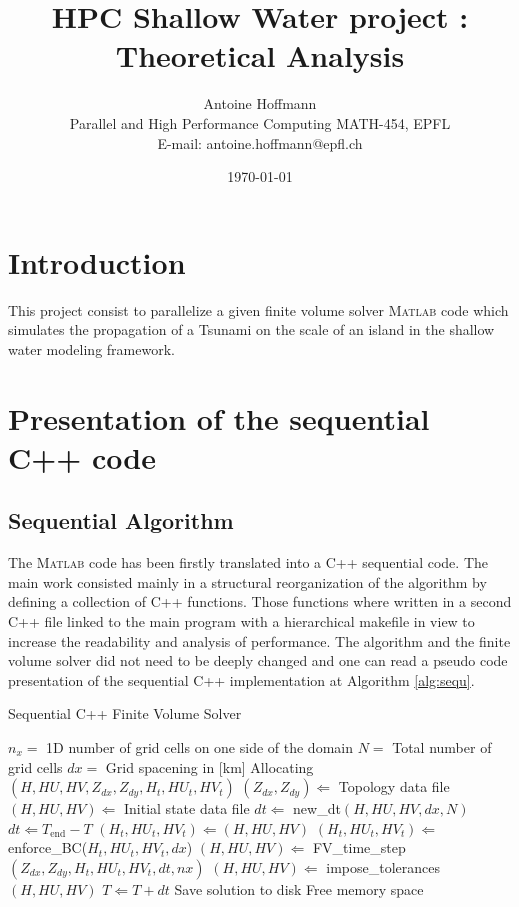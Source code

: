 \documentclass{article}
\title{
	\textbf{HPC Shallow Water project : Theoretical Analysis}
	\\ [2.0cm]
	}
\author
{Antoine Hoffmann\\
	Parallel and High Performance Computing MATH-454, EPFL\\
	\normalsize{E-mail:  antoine.hoffmann@epfl.ch}\\
}
\date{\today}
\begin{document}
\maketitle
\section{Introduction}
This project consist to parallelize a given finite volume solver \textsc{Matlab} code which simulates the propagation of a Tsunami on the scale of an island in the shallow water modeling framework.
\section{Presentation of the sequential C++ code}
\subsection{Sequential Algorithm}
The \textsc{Matlab} code has been firstly translated into a C++ sequential code. The main work consisted mainly in a structural reorganization of the algorithm by defining a collection of C++ functions. Those functions where written in a second C++ file linked to the main program with a hierarchical makefile in view to increase the readability and analysis of performance. The algorithm and the finite volume solver did not need to be deeply changed and one can read a pseudo code presentation of the sequential C++ implementation at Algorithm \ref{alg:sequ}.\\
\begin{algorithm}
	\caption{Sequential C++ Finite Volume Solver}\label{alg:sequ}
\begin{algorithmic}
	\State $n_x =$ 1D number of grid cells on one side of the domain
	\State $N =$ Total number of grid cells
	\State $dx =$ Grid spacening in [km]
	\State Allocating $(H,HU,HV,Z_{dx},Z_{dy},H_t,HU_t,HV_t)$ 
	\State $(Z_{dx}, Z_{dy})	\Leftarrow$ Topology data file 
	\State $(H,HU,HV)\Leftarrow$ Initial state data file  
	 
	\State $dt \Leftarrow$ new\_dt$(H,HU,HV,dx,N)$
	\State $dt \Leftarrow T_{\text{end}}-T$
	\EndIf
	\State $(H_t,HU_t,HV_t)\Leftarrow (H,HU,HV)$
	\State $(H_t,HU_t,HV_t)\Leftarrow$ enforce\_BC($H_t,HU_t,HV_t,dx$)
	\State $(H,HU,HV)\Leftarrow$ FV\_time\_step$(Z_{dx},Z_{dy},H_t,HU_t,HV_t,dt,nx)$
	\State $(H,HU,HV)\Leftarrow$ impose\_tolerances$(H,HU,HV)$
	\State $T\Leftarrow T+dt$
	\EndWhile
	\State Save solution to disk
	\State Free memory space
\end{algorithmic}
\end{algorithm}
\end{document}
